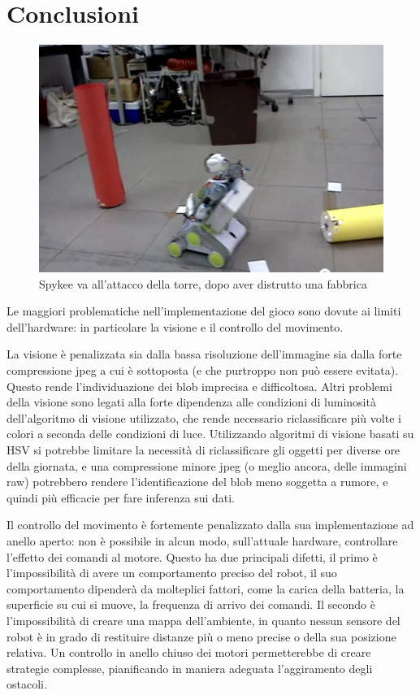 \chapter{Conclusioni}
\label{cap:conclusioni}


\begin{figure}
\centering
\includegraphics[scale=0.7]{images/attaccotorre}
\caption{Spykee va all'attacco della torre, dopo aver distrutto una fabbrica}
\end{figure}

Le maggiori problematiche nell'implementazione del gioco sono dovute ai limiti dell'hardware: in particolare la visione e il controllo del movimento. 

La visione è penalizzata sia dalla bassa risoluzione dell'immagine sia dalla forte compressione jpeg a cui è sottoposta (e che purtroppo non può essere evitata). Questo rende l'individuazione dei blob imprecisa e difficoltosa. Altri problemi della visione sono legati alla forte dipendenza alle condizioni di luminosità dell'algoritmo di visione utilizzato, che rende necessario riclassificare più volte i colori a seconda delle condizioni di luce. Utilizzando algoritmi di visione basati su HSV si potrebbe limitare la necessità di riclassificare gli oggetti per diverse ore della giornata, e una compressione minore jpeg (o meglio ancora, delle immagini raw) potrebbero rendere l'identificazione del blob meno soggetta a rumore, e quindi più efficacie per fare inferenza sui dati.

Il controllo del movimento è fortemente penalizzato dalla sua implementazione ad anello aperto: non è possibile in alcun modo, sull'attuale hardware, controllare l'effetto dei comandi al motore. Questo ha due principali difetti, il primo è l'impossibilità di avere un comportamento preciso del robot, il suo comportamento dipenderà da molteplici fattori, come la carica della batteria, la superficie su cui si muove, la frequenza di arrivo dei comandi. Il secondo è l'impossibilità di creare una mappa dell'ambiente, in quanto nessun sensore del robot è in grado di restituire distanze più o meno precise o della sua posizione relativa. Un controllo in anello chiuso dei motori permetterebbe di creare strategie complesse, pianificando in maniera adeguata l'aggiramento degli ostacoli.

